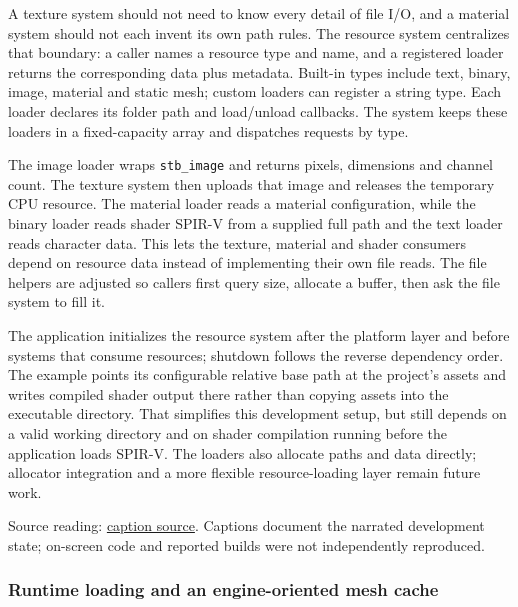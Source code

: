 \hypertarget{06-engine-ii-ch027-loading-different-asset-types-through-resource-loaders}{}

A texture system should not need to know every detail of file I/O, and a material system should not each invent its own path rules. The resource system centralizes that boundary: a caller names a resource type and name, and a registered loader returns the corresponding data plus metadata. Built-in types include text, binary, image, material and static mesh; custom loaders can register a string type. Each loader declares its folder path and load/unload callbacks. The system keeps these loaders in a fixed-capacity array and dispatches requests by type.

The image loader wraps \texttt{stb\_image} and returns pixels, dimensions and channel count. The texture system then uploads that image and releases the temporary CPU resource. The material loader reads a material configuration, while the binary loader reads shader SPIR-V from a supplied full path and the text loader reads character data. This lets the texture, material and shader consumers depend on resource data instead of implementing their own file reads. The file helpers are adjusted so callers first query size, allocate a buffer, then ask the file system to fill it.

The application initializes the resource system after the platform layer and before systems that consume resources; shutdown follows the reverse dependency order. The example points its configurable relative base path at the project's assets and writes compiled shader output there rather than copying assets into the executable directory. That simplifies this development setup, but still depends on a valid working directory and on shader compilation running before the application loads SPIR-V. The loaders also allocate paths and data directly; allocator integration and a more flexible resource-loading layer remain future work.

Source reading: \href{https://www.youtube.com/watch?v=ubin1HH_kqw}{caption source}. Captions document the narrated development state; on-screen code and reported builds were not independently reproduced.

\subsubsection{Runtime loading and an engine-oriented mesh cache}\label{06-engine-ii-ch027-runtime-loading-and-an-engine-oriented-mesh-cache}

